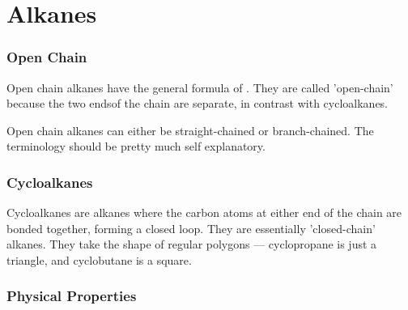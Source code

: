 

\pagebreak
\part{Alkanes}
\hypertarget{ChapterAlkanes}{}

	\section{Open Chain}

		Open chain alkanes have the general formula of . They are called 'open-chain' because
		the two endsof the chain are separate, in contrast with cycloalkanes.

		Open chain alkanes can either be straight-chained or branch-chained. The terminology should be pretty much
		self explanatory.





	\section{Cycloalkanes}

		Cycloalkanes are alkanes where the carbon atoms at either end of the chain are bonded together, forming a closed loop.
		They are essentially 'closed-chain' alkanes. They take the shape of regular polygons –– cyclopropane is just a triangle,
		and cyclobutane is a square.




	\pagebreak
	\section{Physical Properties}

